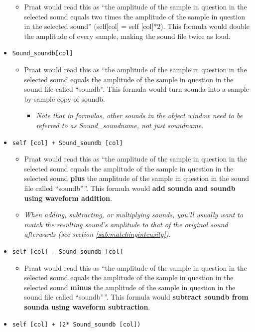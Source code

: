 \begin{itemize}
  \begin{itemize}
  \tightlist
  \item
    Praat would read this as ``the amplitude of the sample in question
    in the selected sound equals two times the amplitude of the sample
    in question in the selected sound'' (self{[}col{]} = self
    {[}col{]}*2). This formula would double the amplitude of every
    sample, making the sound file twice as loud.
  \end{itemize}
\item
  \texttt{Sound\_soundb[col]}

  \begin{itemize}
  \tightlist
  \item
    Praat would read this as ``the amplitude of the sample in question
    in the selected sound equals the amplitude of the sample in question
    in the sound file called ``soundb''. This formula would turn sounda
    into a sample-by-sample copy of soundb.

    \begin{itemize}
    \tightlist
    \item
      \emph{Note that in formulas, other sounds in the object window
      need to be referred to as Sound\_soundname, not just soundname}.
    \end{itemize}
  \end{itemize}
\item
  \texttt{self [col] + Sound\_soundb [col]}

  \begin{itemize}
  \tightlist
  \item
    Praat would read this as ``the amplitude of the sample in question
    in the selected sound equals the amplitude of the sample in question
    in the selected sound \textbf{plus} the amplitude of the sample in
    question in the sound file called ``soundb''''. This formula would
    \textbf{add sounda and soundb using waveform addition}.
  \item
    \emph{When adding, subtracting, or multiplying sounds, you'll
    usually want to match the resulting sound's amplitude to that of the
    original sound afterwards (see section
    \ref{sub:matchingintensity})}.
  \end{itemize}
\item
  \texttt{self [col] - Sound\_soundb [col]}

  \begin{itemize}
  \tightlist
  \item
    Praat would read this as ``the amplitude of the sample in question
    in the selected sound equals the amplitude of the sample in question
    in the selected sound \textbf{minus} the amplitude of the sample in
    question in the sound file called ``soundb''''. This formula would
    \textbf{subtract soundb from sounda using waveform subtraction}.
  \end{itemize}
\item
  \texttt{self [col] + (2* Sound\_soundb [col])}


\end{itemize}
